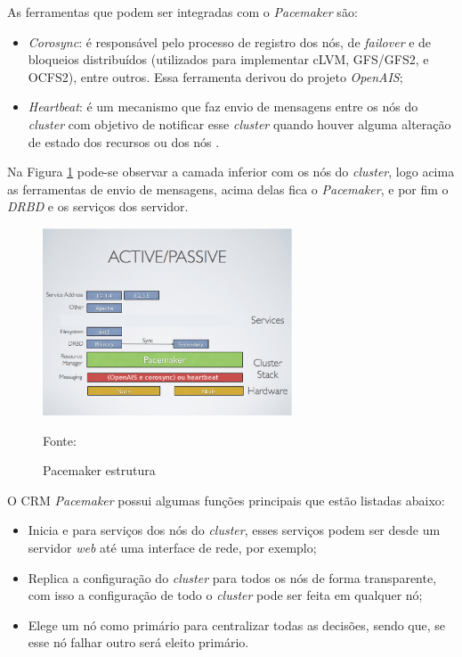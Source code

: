 As ferramentas que podem ser integradas com o \textit{Pacemaker} são:
\begin{itemize}
 \item \textit{Corosync}: é responsável pelo processo de registro dos nós, de \textit{failover} e de bloqueios distribuídos (utilizados para 
 implementar cLVM, GFS/GFS2, e OCFS2), entre outros. Essa ferramenta derivou do projeto \textit{OpenAIS};
 \item \textit{Heartbeat}: é um mecanismo que faz envio de mensagens entre os nós do \textit{cluster} com objetivo de notificar esse 
 \textit{cluster} quando houver alguma alteração de estado dos recursos ou dos nós \cite{clusterlabs}.
\end{itemize}

Na Figura \ref{fig:pacemaker_tools} pode-se observar a camada inferior com os nós do \textit{cluster}, logo acima as ferramentas de envio de 
mensagens, acima delas fica o \textit{Pacemaker}, e por fim o \textit{DRBD} e os serviços dos servidor.

\begin{figure}[h!]
 \centering
 \includegraphics[width=280px]{img/pacemaker_tools.eps}
 \caption{Pacemaker estrutura}
 Fonte: \citet{pacemaker}
 \label{fig:pacemaker_tools}
\end{figure}


O \ac{CRM} \textit{Pacemaker} possui algumas funções principais que estão listadas abaixo:
\begin{itemize}
 \item Inicia e para serviços dos nós do \textit{cluster}, esses serviços podem ser desde um servidor \textit{web} até uma interface de rede, 
 por exemplo;
 \item Replica a configuração do \textit{cluster} para todos os nós de forma transparente, com isso a configuração de todo o \textit{cluster} 
 pode ser feita em qualquer nó;
 \item Elege um nó como primário para centralizar todas as decisões, sendo que, se esse nó falhar outro será eleito primário.
\end{itemize}


